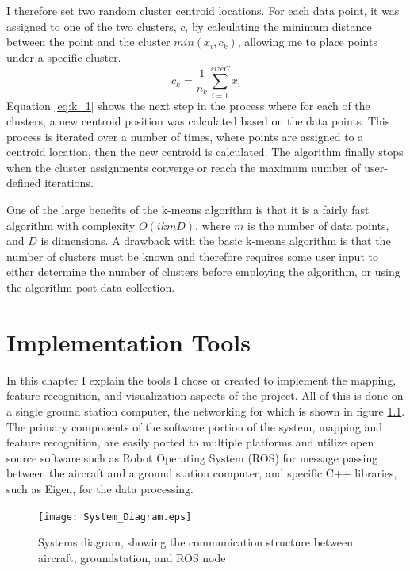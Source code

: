 \documentclass[12pt]{report}
\begin{document}
I therefore set two random cluster centroid locations. For each data point, it was assigned to one of the two clusters, $c$, by calculating the minimum distance between the point and the cluster $min(x_i,c_k)$, allowing me to place points under a specific cluster. 
\begin{equation}
	c_k = \frac{1}{n_k}\sum\limits_{i=1}^{sizeC}x_i
	\label{eq:k_1}
\end{equation}
Equation \ref{eq:k_1} shows the next step in the process where for each of the clusters, a new centroid position was calculated based on the data points. This process is iterated over a number of times, where points are assigned to a centroid location, then the new centroid is calculated. The algorithm finally stops when the cluster assignments converge or reach the maximum number of user-defined iterations.

One of the large benefits of the k-means algorithm is that it is a fairly fast algorithm with complexity $O(ikmD)$, where $m$ is the number of data points, and $D$ is dimensions. A drawback with the basic k-means algorithm is that the number of clusters must be known and therefore requires some user input to either determine the number of clusters before employing the algorithm, or using the algorithm post data collection.

\chapter{Implementation Tools}
In this chapter I explain the tools I chose or created to implement the mapping, feature recognition, and visualization aspects of the project. All of this is done on a single ground station computer, the networking for which is shown in figure \ref{system_diagram}. The primary components of the software portion of the system, mapping and feature recognition, are easily ported to multiple platforms and utilize open source software such as Robot Operating System (ROS) for message passing between the aircraft and a ground station computer, and specific C++ libraries, such as Eigen, for the data processing.  

\begin{figure}[!ht]
	\centering
    \texttt{[image: System\_Diagram.eps]}  
    \caption{Systems diagram, showing the communication structure between aircraft, groundstation, and ROS node}
    \label{system_diagram}
\end{figure}
\end{document}
